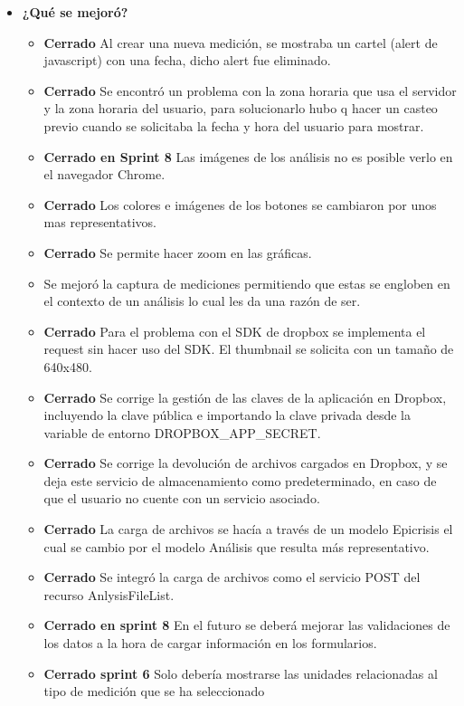 \begin{itemize}
 		\item \textbf{¿Qué se mejoró?}
 		\begin{itemize}
 			\item \textbf{Cerrado} Al crear una nueva medición, se mostraba un cartel (alert de javascript) con una fecha, dicho alert fue eliminado.
 			\item \textbf{Cerrado} Se encontró un problema con la zona horaria que usa el servidor y la zona horaria del usuario, para solucionarlo hubo q hacer un casteo previo cuando se solicitaba la fecha y hora del usuario para mostrar.
			\item \textbf{Cerrado en Sprint 8} Las imágenes de los análisis no es posible verlo en el navegador Chrome.
			\item \textbf{Cerrado} Los colores e imágenes de los botones se cambiaron por unos mas representativos.
			\item \textbf{Cerrado} Se permite hacer zoom en las gráficas.
			\item Se mejoró la captura de mediciones permitiendo que estas se engloben en el contexto de un análisis lo cual les da una razón de ser.
            \item \textbf{Cerrado} Para el problema con el SDK de dropbox se implementa el request sin hacer uso del SDK. El thumbnail se solicita con un tamaño de 640x480.
            \item \textbf{Cerrado} Se corrige la gestión de las claves de la aplicación en Dropbox, incluyendo la clave pública e importando la clave privada desde la variable de entorno DROPBOX\_APP\_SECRET.
            \item \textbf{Cerrado} Se corrige la devolución de archivos cargados en Dropbox, y se deja este servicio de almacenamiento como predeterminado, en caso de que el usuario no cuente con un servicio asociado.
            \item \textbf{Cerrado} La carga de archivos se hacía a través de un modelo Epicrisis el cual se cambio por el modelo Análisis que resulta más representativo.
            \item \textbf{Cerrado} Se integró la carga de archivos como el servicio POST del recurso AnlysisFileList.	
			\item \textbf{Cerrado en sprint 8} En el futuro se deberá mejorar las validaciones de los datos a la hora de cargar información en los formularios.   
 			\item \textbf{Cerrado sprint 6} Solo debería mostrarse las unidades relacionadas al tipo de medición que se ha seleccionado	

\end{itemize}
\end{itemize}
